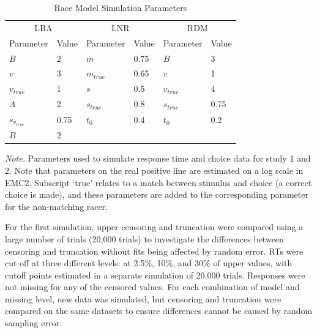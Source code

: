 \documentclass[
  stu,
  floatsintext,
  longtable,
  nolmodern,
  notxfonts,
  notimes,
  draftfirst,
  colorlinks=true,linkcolor=blue,citecolor=blue,urlcolor=blue]{apa7}
\begin{document}
\begin{table}

{\caption{{Race Model Simulation Parameters}{\label{tbl-pars}}}}

\begin{tabular}[t]{llllll}
\toprule
\multicolumn{2}{c}{LBA} & \multicolumn{2}{c}{LNR} & \multicolumn{2}{c}{RDM} \\
\cmidrule(l{3pt}r{3pt}){1-2} \cmidrule(l{3pt}r{3pt}){3-4} \cmidrule(l{3pt}r{3pt}){5-6}
\multicolumn{1}{c}{Parameter} & \multicolumn{1}{c}{Value} & \multicolumn{1}{c}{Parameter} & \multicolumn{1}{c}{Value} & \multicolumn{1}{c}{Parameter} & \multicolumn{1}{c}{Value} \\
\cmidrule(l{3pt}r{3pt}){1-1} \cmidrule(l{3pt}r{3pt}){2-2} \cmidrule(l{3pt}r{3pt}){3-3} \cmidrule(l{3pt}r{3pt}){4-4} \cmidrule(l{3pt}r{3pt}){5-5} \cmidrule(l{3pt}r{3pt}){6-6}
$B$ & 2 & $m$ & 0.75 & $B$ & 3\\
$v$ & 3 & $m_{true}$ & 0.65 & $v$ & 1\\
$v_{true}$ & 1 & $s$ & 0.5 & $v_{true}$ & 4\\
$A$ & 2 & $s_{true}$ & 0.8 & $s_{true}$ & 0.75\\
$s_{v_{true}}$ & 0.75 & $t_0$ & 0.4 & $t_0$ & 0.2\\
\addlinespace
$B$ & 2 &  &  &  & \\
\bottomrule
\end{tabular}

{\noindent \emph{Note.} Parameters used to simulate response time and
choice data for study 1 and 2. Note that parameters on the real positive
line are estimated on a log scale in EMC2. Subscript `true' relates to a
match between stimulus and choice (a correct choice is made), and these
parameters are added to the corresponding parameter for the non-matching
racer.}

\end{table}

For the first simulation, upper censoring and truncation were compared
using a large number of trials (20,000 trials) to investigate the
differences between censoring and truncation without fits being affected
by random error. RTs were cut off at three different levels: at 2.5\%,
10\%, and 30\% of upper values, with cutoff points estimated in a
separate simulation of 20,000 trials. Responses were not missing for any
of the censored values. For each combination of model and missing level,
new data was simulated, but censoring and truncation were compared on
the same datasets to ensure differences cannot be caused by random
sampling error.
\end{document}
